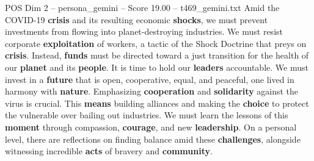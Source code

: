 \begin{textsample}{POS Dim 2 – persona\_gemini – Score 19.00 – t469\_gemini.txt}  \label{ex:f2_pos_049}
Amid the COVID-19 \textbf{crisis} and its resulting economic \textbf{shocks}, we must prevent investments from flowing into planet-destroying industries.
We must resist corporate \textbf{exploitation} of workers, a tactic of the Shock Doctrine that preys on \textbf{crisis}.
Instead, \textbf{funds} must be directed toward a just transition for the health of our \textbf{planet} and its \textbf{people}.
It is time to hold our \textbf{leaders} accountable.
We must invest in a \textbf{future} that is open, cooperative, equal, and peaceful, one lived in harmony with \textbf{nature}.
Emphasizing \textbf{cooperation} and \textbf{solidarity} against the virus is crucial.
This \textbf{means} building alliances and making the \textbf{choice} to protect the vulnerable over bailing out industries.
We must learn the lessons of this \textbf{moment} through compassion, \textbf{courage}, and new \textbf{leadership}.
On a personal level, there are reflections on finding balance amid these \textbf{challenges}, alongside witnessing incredible \textbf{acts} of bravery and \textbf{community}.

\end{textsample}
